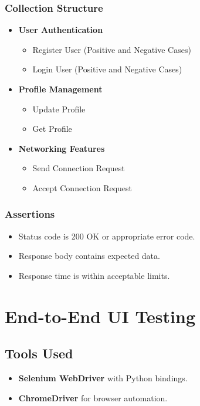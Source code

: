 \documentclass[12pt,a4paper]{report}
\begin{document}
\subsection{Collection Structure}
\begin{itemize}
    \item \textbf{User Authentication}
        \begin{itemize}
            \item Register User (Positive and Negative Cases)
            \item Login User (Positive and Negative Cases)
        \end{itemize}
    \item \textbf{Profile Management}
        \begin{itemize}
            \item Update Profile
            \item Get Profile
        \end{itemize}
    \item \textbf{Networking Features}
        \begin{itemize}
            \item Send Connection Request
            \item Accept Connection Request
        \end{itemize}
\end{itemize}

\subsection{Assertions}
\begin{itemize}
    \item Status code is 200 OK or appropriate error code.
    \item Response body contains expected data.
    \item Response time is within acceptable limits.
\end{itemize}

\chapter{End-to-End UI Testing}
\section{Tools Used}
\begin{itemize}
    \item \textbf{Selenium WebDriver} with Python bindings.
    \item \textbf{ChromeDriver} for browser automation.
\end{itemize}
\end{document}
